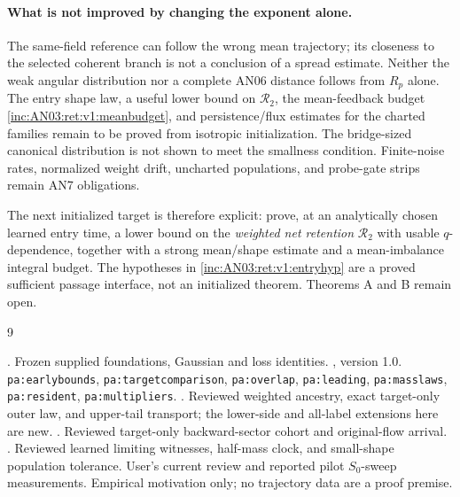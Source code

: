 \documentclass[11pt]{article}
\numberwithin{equation}{section}
\theoremstyle{remark}\newtheorem{remark}[theorem]{Remark}
\newcommand{\1}{\mathbf 1}
\begin{document}
\paragraph{What is not improved by changing the exponent alone.}
The same-field reference can follow the wrong mean trajectory; its
closeness to the selected coherent branch is not a conclusion of a
spread estimate. Neither the weak angular distribution nor a complete
AN06 distance follows from $R_p$ alone. The entry shape law, a useful
lower bound on $\mathcal R_2$, the mean-feedback budget
\eqref{inc:AN03:ret:v1:meanbudget}, and persistence/flux estimates for the
charted families remain to be proved from isotropic initialization.
The bridge-sized canonical distribution is not shown to meet the
smallness condition. Finite-noise rates, normalized weight drift,
uncharted populations, and probe-gate strips remain AN7 obligations.

The next initialized target is therefore explicit: prove, at an
analytically chosen learned entry time, a lower bound on the
\emph{weighted net retention} $\mathcal R_2$ with usable $q$-dependence,
together with a strong mean/shape estimate and a mean-imbalance integral
budget. The hypotheses in \eqref{inc:AN03:ret:v1:entryhyp} are a proved
sufficient passage interface, not an initialized theorem. Theorems A
and B remain open.

\begin{thebibliography}{9}
\raggedright
{} .
Frozen supplied foundations, Gaussian and loss identities.
 , version 1.0.
\texttt{pa:earlybounds}, \texttt{pa:targetcomparison}, \texttt{pa:overlap},
\texttt{pa:leading}, \texttt{pa:masslaws}, \texttt{pa:resident},
\texttt{pa:multipliers}.
 .
Reviewed weighted ancestry, exact target-only outer law, and upper-tail
transport; the lower-side and all-label extensions here are new.
 .
Reviewed target-only backward-sector cohort and original-flow arrival.
 .
Reviewed learned limiting witnesses, half-mass clock, and small-shape
population tolerance.
 User's current review and reported pilot $S_0$-sweep
measurements. Empirical motivation only; no trajectory data are a proof
premise.
\end{thebibliography}
\end{document}
